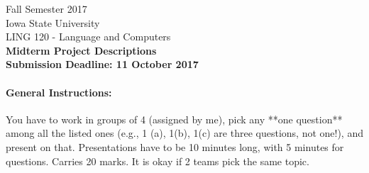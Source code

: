 \documentclass[11pt,a4paper]{article}
\begin{document}
\begin{center}
  Fall Semester 2017 \\ Iowa State University\\[3ex]
  {\large LING 120 - Language and Computers}\\[3ex]
  \textbf{Midterm Project Descriptions} \\ \textbf{Submission Deadline: 11 October 2017}
\end{center}

\paragraph{General Instructions: } You have to work in groups of 4 (assigned by me), pick any **one question** among all the listed ones (e.g., 1 (a), 1(b), 1(c) are three questions, not one!), and present on that. Presentations have to be 10 minutes long, with 5 minutes for questions. Carries 20 marks. It is okay if 2 teams pick the same topic. 
\end{document}
